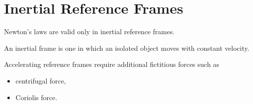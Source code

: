 \section{Inertial Reference Frames}

Newton's laws are valid only in inertial reference frames.

An inertial frame is one in which an isolated object moves with constant velocity.

Accelerating reference frames require additional fictitious forces such as

\begin{itemize}
	\item centrifugal force,
	\item Coriolis force.
\end{itemize}

